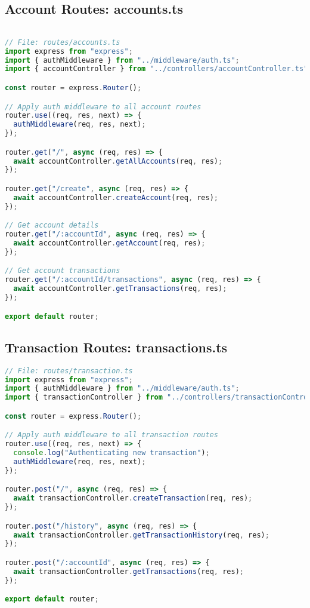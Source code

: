 \subsection{Account Routes: accounts.ts}
\begin{lstlisting}[language=TypeScript]

// File: routes/accounts.ts
import express from "express";
import { authMiddleware } from "../middleware/auth.ts";
import { accountController } from "../controllers/accountController.ts";

const router = express.Router();

// Apply auth middleware to all account routes
router.use((req, res, next) => {
  authMiddleware(req, res, next);
});

router.get("/", async (req, res) => {
  await accountController.getAllAccounts(req, res);
});

router.get("/create", async (req, res) => {
  await accountController.createAccount(req, res);
});

// Get account details
router.get("/:accountId", async (req, res) => {
  await accountController.getAccount(req, res);
});

// Get account transactions
router.get("/:accountId/transactions", async (req, res) => {
  await accountController.getTransactions(req, res);
});

export default router;
\end{lstlisting}

\subsection{Transaction Routes: transactions.ts}
\begin{lstlisting}[language=TypeScript]
// File: routes/transaction.ts
import express from "express";
import { authMiddleware } from "../middleware/auth.ts";
import { transactionController } from "../controllers/transactionController.ts";

const router = express.Router();

// Apply auth middleware to all transaction routes
router.use((req, res, next) => {
  console.log("Authenticating new transaction");
  authMiddleware(req, res, next);
});

router.post("/", async (req, res) => {
  await transactionController.createTransaction(req, res);
});

router.post("/history", async (req, res) => {
  await transactionController.getTransactionHistory(req, res);
});

router.post("/:accountId", async (req, res) => {
  await transactionController.getTransactions(req, res);
});

export default router;
\end{lstlisting}


